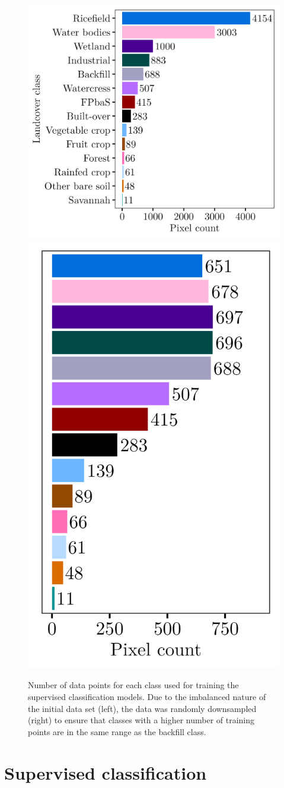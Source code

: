 \documentclass[11pt, A4, oneside]{report}
\begin{document}
\begin{figure}[H]
\includegraphics[width = 9.7 cm]{figures/2_methods/All training data.png}
\includegraphics[width = 5.3 cm]{figures/2_methods/Subsampled training data to BF size.png}
\caption{Number of data points for each class used for training the supervised classification models. Due to the imbalanced nature of the initial data set (left), the data was randomly downsampled (right) to ensure that classes with a higher number of training points are in the same range as the backfill class.}
\label{fig:training:data}
\end{figure}

\section{Supervised classification}
\end{document}
